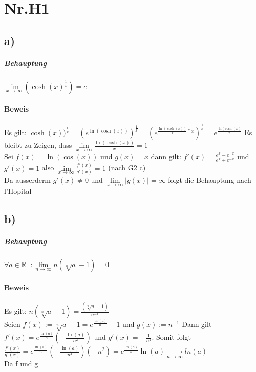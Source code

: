 \section*{Nr.H1}
\subsection*{a)}



\subparagraph*{Behauptung}

$\lim\limits_{x \to \infty}(\cosh(x)^{\frac{1}{x}}) = e$

\paragraph*{Beweis}

Es gilt: $\cosh(x))^{\frac{1}{x}} = (e^{\ln(\cosh(x))})^{\frac{1}{x}}
= (e^{\frac {\ln(\cosh(x))}{x}*x})^{\frac{1}{x}} = e^{\frac{\ln(\cosh(x)}{x}}$
Es bleibt zu Zeigen, dass $\lim\limits_{x \to \infty}\frac{\ln(\cosh(x))}{x} = 1 $\\ 
Sei $f(x) = \ln(\cos(x))$ und $g(x)=x$ dann gilt: $f'(x) = \frac{e^{x}-e^{-x}}{e^{x}+e^{-x}} $ und $g'(x) = 1$ also  $\lim\limits_{   x \to \infty} \frac{f'(x)}{g'(x)} = 1 $ (nach G2 c) \\
Da ausserderm $g'(x)\neq 0$ und $ \lim\limits_{x\to\infty} |g(x)| = \infty $ folgt die Behauptung nach l'Hopital

\subsection*{b)}

\subparagraph*{Behauptung}

$\forall a\in \mathbb{R}_{+}:\lim\limits_{n \to \infty} n(\sqrt[n]{a}-1) = 0$

\paragraph*{Beweis}
Es gilt: $n(\sqrt[n]{a}-1) = \frac{(\sqrt[n]{a}-1)}{n^{-1}}$\\
Seien $f(x):= \sqrt[n]{a}-1 = e^{\frac{\ln(a)}{n}}-1$ und $g(x):=n^{-1}$ Dann gilt \\
$f'(x) = e^{\frac{\ln(a)}{n}}(-\frac{\ln(a)}{n^2})$ und $g'(x) = -\frac{1}{n^2}$. Somit folgt \\
$\frac{f'(x)}{g'(x)} = e^{\frac{\ln(a)}{n}}(-\frac{\ln(a)}{n^{2}})(-n^{2}) = e^{\frac{\ln(a)}{n}}\ln(a) \xrightarrow[n \to \infty]{} ln(a)$ \\ Da f und g 




